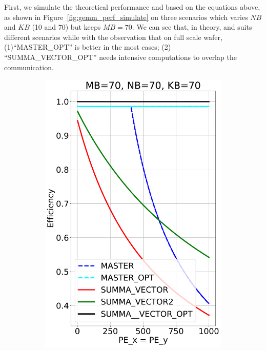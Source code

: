
 
First, we simulate the theoretical performance \master and \summa based on the equations above, as shown in Figure~\ref{fig:gemm_perf_simulate} on three scenarios which varies $NB$ and $KB$ (10 and 70) but keeps $MB=70$.
%
We can see that, in theory, \master and \summa suits different scenarios while with the observation that on full scale wafer, (1)``MASTER\_OPT'' is better in the most cases; (2) ``SUMMA\_VECTOR\_OPT'' needs intensive computations to overlap the communication.

\begin{figure}[t!]
  \centering
  \begin{subfigure}{0.32\columnwidth}
    \includegraphics[width=\linewidth]{figures/efficiency_cost_70_70_70.pdf}

\end{subfigure}
\end{figure}
